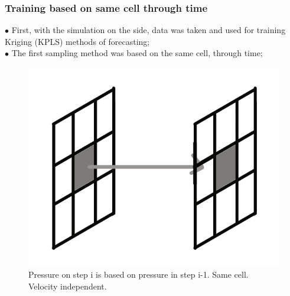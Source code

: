 \documentclass[xcolor=dvipsnames,10pt,aspectratio=169]{beamer}
\begin{document}
\begin{frame}\frametitle{Training based on same cell through time}
	\begin{minipage}[h!]{0.49\textwidth}
		$\bullet$ First, with the simulation on the side, data was taken and used for training Kriging (KPLS) methods of forecasting;\\
		$\bullet$ The first sampling method was based on the same cell, through time;\\
	\end{minipage}
	\begin{minipage}[h!]{0.5\textwidth}
		\begin{figure}

			\centering
			\includegraphics[clip=true, scale=2]{figuras/time_step_pressure_1.png}
	 		\caption{Pressure on step i is based on pressure in step i-1. Same cell. Velocity independent.}
		\end{figure}
	\end{minipage}
\end{frame}
\end{document}
